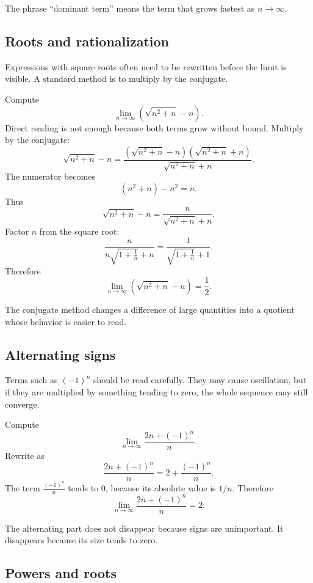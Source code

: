 The phrase ``dominant term'' means the term that grows fastest as \(n\to\infty\).

\subsection*{Roots and rationalization}

Expressions with square roots often need to be rewritten before the limit is visible. A standard method is to multiply by the conjugate.

\begin{examplebox}
Compute
\[
\lim_{n\to\infty}\left(\sqrt{n^2+n}-n\right).
\]
Direct reading is not enough because both terms grow without bound. Multiply by the conjugate:
\[
\sqrt{n^2+n}-n
=\frac{(\sqrt{n^2+n}-n)(\sqrt{n^2+n}+n)}{\sqrt{n^2+n}+n}.
\]
The numerator becomes
\[
(n^2+n)-n^2=n.
\]
Thus
\[
\sqrt{n^2+n}-n=\frac{n}{\sqrt{n^2+n}+n}.
\]
Factor \(n\) from the square root:
\[
\frac{n}{n\sqrt{1+\frac1n}+n}
=
\frac{1}{\sqrt{1+\frac1n}+1}.
\]
Therefore
\[
\lim_{n\to\infty}\left(\sqrt{n^2+n}-n\right)=\frac12.
\]
\end{examplebox}

The conjugate method changes a difference of large quantities into a quotient whose behavior is easier to read.

\subsection*{Alternating signs}

Terms such as \((-1)^n\) should be read carefully. They may cause oscillation, but if they are multiplied by something tending to zero, the whole sequence may still converge.

\begin{examplebox}
Compute
\[
\lim_{n\to\infty}\frac{2n+(-1)^n}{n}.
\]
Rewrite as
\[
\frac{2n+(-1)^n}{n}=2+\frac{(-1)^n}{n}.
\]
The term \(\frac{(-1)^n}{n}\) tends to \(0\), because its absolute value is \(1/n\). Therefore
\[
\lim_{n\to\infty}\frac{2n+(-1)^n}{n}=2.
\]
\end{examplebox}

The alternating part does not disappear because signs are unimportant. It disappears because its size tends to zero.

\subsection*{Powers and roots}

